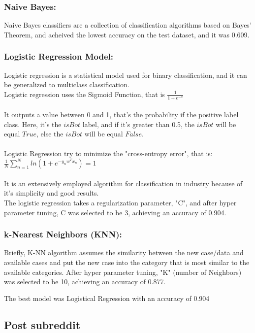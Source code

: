 \documentclass{article}
\begin{document}
    \subsubsection{Naive Bayes:}
    Naive Bayes classifiers are a collection of classification algorithms based on Bayes’ Theorem, and acheived the lowest accuracy on the test dataset, and it was 0.609.
    
    \subsubsection{Logistic Regression Model:}
    
    Logistic regression is a statistical model used for binary classification, and it can be generalized to multiclass classification. \\
Logistic regression uses the Sigmoid Function, that is $\frac{1}{1+e^{-x}}$\\ \\ It outputs a value between 0 and 1, that's the probability if the positive label class. Here, it's the $isBot$ label, and if it's greater than 0.5, the $isBot$ will be equal $True$, else the $isBot$ will be equal $False$.  \\ \\
Logistic Regression try to minimize the "cross-entropy error", that is:\\ $\frac{1}{N} \sum_{n=1}^{N} ln(1 + e^ {-y_{n}w^Tx_n}) = 1$\\ \\
It is an extensively employed algorithm for classification in industry because of it's simplicity and good results. \\
The logistic regression takes a regularization parameter, "C", and after hyper parameter tuning, C was selected to be 3, achieving an accuracy of 0.904. 

 \subsubsection{k-Nearest Neighbors (KNN):}   
Briefly, K-NN algorithm assumes the similarity between the new case/data and available cases and put the new case into the category that is most similar to the available categories.
After hyper parameter tuning, "K" (number of Neighbors) was selected to be 10, achieving an accuracy of 0.877. 

        The best model was Logistical Regression with an accuracy of 0.904

    \subsection{Post subreddit}  
    
\end{document}
